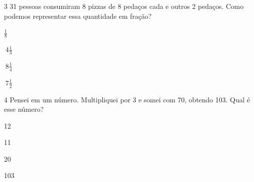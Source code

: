 
\num{3} 31 pessoas consumiram 8 pizzas de 8 pedaços cada e outros 2 pedaços.
Como podemos representar essa quantidade em fração?

\begin{escolha}
\item $\frac{1}{8}$
\item $\ 4\frac{1}{3}$
\item $\ 8\frac{1}{4}$
\item $\ 7\frac{1}{2}$
\end{escolha}




\num{4} Pensei em um número. Multipliquei por 3 e somei com 70, obtendo 103.
Qual é esse número?

\begin{escolha}
\item 12
\item 11
\item 20
\item 103
\end{escolha}



